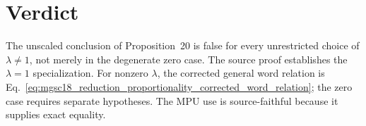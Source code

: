 \documentclass{article}
\begin{document}
\section{Verdict}

The unscaled conclusion of Proposition~20 is false for every unrestricted
choice of $\lambda\ne1$, not merely in the degenerate zero case.  The source
proof establishes the $\lambda=1$ specialization.  For nonzero $\lambda$, the
corrected general word relation is
Eq.~\ref{eq:mgsc18_reduction_proportionality_corrected_word_relation}; the
zero case requires separate hypotheses.  The MPU use is source-faithful
because it supplies exact equality.



\end{document}
